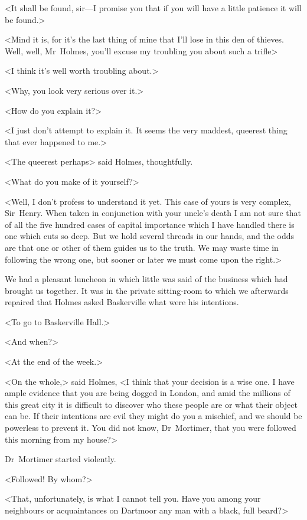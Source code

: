 <It shall be found, sir—I promise you that if you will have a little patience it will be found.>

<Mind it is, for it's the last thing of mine that I'll lose in this den of thieves. Well, well, Mr~Holmes, you'll excuse my troubling you about such a trifle\longdash>

<I think it's well worth troubling about.>

<Why, you look very serious over it.>

<How do you explain it?>

<I just don't attempt to explain it. It seems the very maddest, queerest thing that ever happened to me.>

<The queerest perhaps\longdash> said Holmes, thoughtfully.

<What do you make of it yourself?>

<Well, I don't profess to understand it yet. This case of yours is very complex, Sir~Henry. When taken in conjunction with your uncle's death I am not sure that of all the five hundred cases of capital importance which I have handled there is one which cuts so deep. But we hold several threads in our hands, and the odds are that one or other of them guides us to the truth. We may waste time in following the wrong one, but sooner or later we must come upon the right.>

We had a pleasant luncheon in which little was said of the business which had brought us together. It was in the private sitting-room to which we afterwards repaired that Holmes asked Baskerville what were his intentions.

<To go to Baskerville Hall.>

<And when?>

<At the end of the week.>

<On the whole,> said Holmes, <I think that your decision is a wise one. I have ample evidence that you are being dogged in London, and amid the millions of this great city it is difficult to discover who these people are or what their object can be. If their intentions are evil they might do you a mischief, and we should be powerless to prevent it. You did not know, Dr~Mortimer, that you were followed this morning from my house?>

Dr~Mortimer started violently.

<Followed! By whom?>

<That, unfortunately, is what I cannot tell you. Have you among your neighbours or acquaintances on Dartmoor any man with a black, full beard?>

